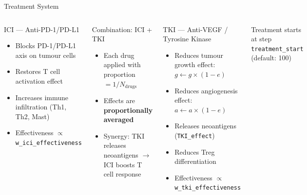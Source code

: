 \documentclass[aspectratio=169,10pt]{beamer}
\begin{document}
\begin{frame}{Treatment System}
  \begin{columns}[T]
    \begin{block}{ICI --- Anti-PD-1/PD-L1}
      \begin{itemize}
        \item Blocks PD-1/PD-L1 axis on tumour cells
        \item Restores T cell activation effect
        \item Increases immune infiltration (Th1, Th2, Mast)
        \item Effectiveness $\propto$ \texttt{w\_ici\_effectiveness}
      \end{itemize}
    \end{block}

    \begin{block}{Combination: ICI + TKI}
      \begin{itemize}
        \item Each drug applied with proportion $= 1/N_\text{drugs}$
        \item Effects are \textbf{proportionally averaged}
        \item Synergy: TKI releases neoantigens $\to$ ICI boosts T cell response
      \end{itemize}
    \end{block}

    \begin{block}{TKI --- Anti-VEGF / Tyrosine Kinase}
      \begin{itemize}
        \item Reduces tumour growth effect: $g \leftarrow g \times (1 - e)$
        \item Reduces angiogenesis effect: $a \leftarrow a \times (1 - e)$
        \item Releases neoantigens (\texttt{TKI\_effect})
        \item Reduces Treg differentiation
        \item Effectiveness $\propto$ \texttt{w\_tki\_effectiveness}
      \end{itemize}
    \end{block}
    \vspace{0.3em}
    \centering
    \small Treatment starts at step \texttt{treatment\_start}\\(default: 100)
  \end{columns}
\end{frame}
\end{document}
